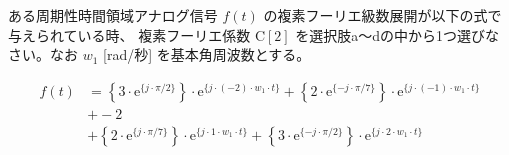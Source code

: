 ある周期性時間領域アナログ信号 $f(t)$ の複素フーリエ級数展開が以下の式で与えられている時、
複素フーリエ係数 $\textrm{C}[2]$ を選択肢a〜dの中から1つ選びなさい。なお $w_1$ [rad/秒] を基本角周波数とする。

\begin{align*}
f(t) 
&= \left \{ 3 \cdot \textrm{e}^{\{ j \cdot \pi/2 \}} \right \} \cdot \textrm{e}^{\{ j \cdot (-2) \cdot w_1 \cdot t \}} 
 + \left \{ 2 \cdot \textrm{e}^{\{-j \cdot \pi/7 \}} \right \} \cdot \textrm{e}^{\{ j \cdot (-1) \cdot w_1 \cdot t \}} \\
&+ -2 \\
&+ \left \{ 2 \cdot \textrm{e}^{\{ j \cdot \pi/7 \}} \right \} \cdot \textrm{e}^{\{ j \cdot    1 \cdot w_1 \cdot t \}} 
 + \left \{ 3 \cdot \textrm{e}^{\{-j \cdot \pi/2 \}} \right \} \cdot \textrm{e}^{\{ j \cdot    2 \cdot w_1 \cdot t \}} 
\end{align*}
